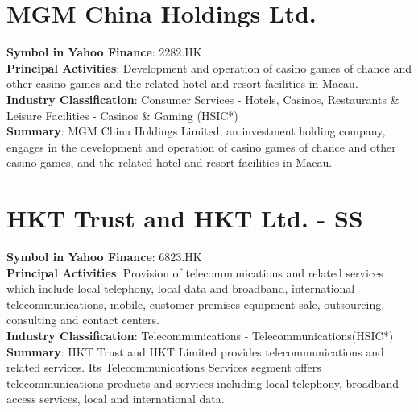\section{MGM China Holdings Ltd.}
\textbf{Symbol in Yahoo Finance}: 2282.HK\\
\textbf{Principal Activities}: Development and operation of casino games of chance and other casino games and the related hotel and resort facilities in Macau.\\
\textbf{Industry Classification}: Consumer Services - Hotels, Casinos, Restaurants \& Leisure Facilities - Casinos \& Gaming (HSIC*)\\
\textbf{Summary}: MGM China Holdings Limited, an investment holding company, engages in the development and operation of casino games of chance and other casino games, and the related hotel and resort facilities in Macau.


\section{HKT Trust and HKT Ltd. - SS}
\textbf{Symbol in Yahoo Finance}: 6823.HK\\
\textbf{Principal Activities}: Provision of telecommunications and related services which include local telephony, local data and broadband, international telecommunications, mobile, customer premises equipment sale, outsourcing, consulting and contact centers.\\
\textbf{Industry Classification}: Telecommunications - Telecommunications(HSIC*)\\
\textbf{Summary}: HKT Trust and HKT Limited provides telecommunications and related services. Its Telecommunications Services segment offers telecommunications products and services including local telephony, broadband access services, local and international data.
